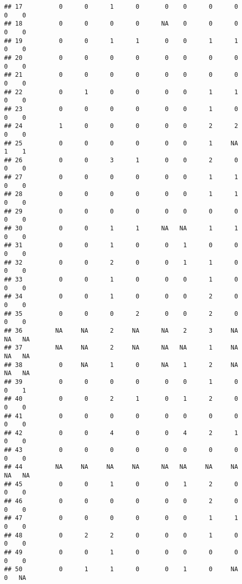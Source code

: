 \documentclass[
]{article}
\begin{document}
\begin{verbatim}
## 17          0      0      1      0       0    0      0      0       0    0
## 18          0      0      0      0      NA    0      0      0       0    0
## 19          0      0      1      1       0    0      1      1       0    0
## 20          0      0      0      0       0    0      0      0       0    0
## 21          0      0      0      0       0    0      0      0       0    0
## 22          0      1      0      0       0    0      1      1       0    0
## 23          0      0      0      0       0    0      1      0       0    0
## 24          1      0      0      0       0    0      2      2       0    0
## 25          0      0      0      0       0    0      1     NA       1    1
## 26          0      0      3      1       0    0      2      0       0    0
## 27          0      0      0      0       0    0      1      1       0    0
## 28          0      0      0      0       0    0      1      1       0    0
## 29          0      0      0      0       0    0      0      0       0    0
## 30          0      0      1      1      NA   NA      1      1       0    0
## 31          0      0      1      0       0    1      0      0       0    0
## 32          0      0      2      0       0    1      1      0       0    0
## 33          0      0      1      0       0    0      1      0       0    0
## 34          0      0      1      0       0    0      2      0       0    0
## 35          0      0      0      2       0    0      2      0       0    0
## 36         NA     NA      2     NA      NA    2      3     NA      NA   NA
## 37         NA     NA      2     NA      NA   NA      1     NA      NA   NA
## 38          0     NA      1      0      NA    1      2     NA      NA   NA
## 39          0      0      0      0       0    0      1      0       0    1
## 40          0      0      2      1       0    1      2      0       0    0
## 41          0      0      0      0       0    0      0      0       0    0
## 42          0      0      4      0       0    4      2      1       0    0
## 43          0      0      0      0       0    0      0      0       0    0
## 44         NA     NA     NA     NA      NA   NA     NA     NA      NA   NA
## 45          0      0      1      0       0    1      2      0       0    0
## 46          0      0      0      0       0    0      2      0       0    0
## 47          0      0      0      0       0    0      1      1       0    0
## 48          0      2      2      0       0    0      1      0       0    0
## 49          0      0      1      0       0    0      0      0       0    0
## 50          0      1      1      0       0    1      0     NA       0   NA

\end{verbatim}
\end{document}
